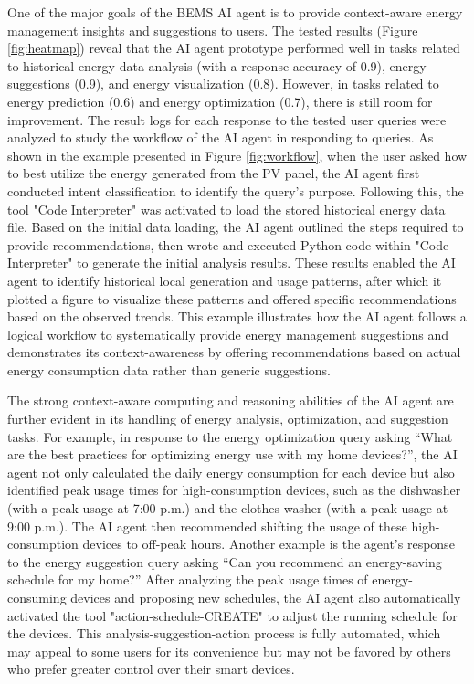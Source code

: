 \documentclass[final,3p,times]{elsarticle}
\begin{document}
One of the major goals of the BEMS AI agent is to provide context-aware energy management insights and suggestions to users. The tested results (Figure \ref{fig:heatmap}) reveal that the AI agent prototype performed well in tasks related to historical energy data analysis (with a response accuracy of 0.9), energy suggestions (0.9), and energy visualization (0.8). However, in tasks related to energy prediction (0.6) and energy optimization (0.7), there is still room for improvement. The result logs for each response to the tested user queries were analyzed to study the workflow of the AI agent in responding to queries. As shown in the example presented in Figure \ref{fig:workflow}, when the user asked how to best utilize the energy generated from the PV panel, the AI agent first conducted intent classification to identify the query's purpose. Following this, the tool "Code Interpreter" was activated to load the stored historical energy data file. Based on the initial data loading, the AI agent outlined the steps required to provide recommendations, then wrote and executed Python code within "Code Interpreter" to generate the initial analysis results. These results enabled the AI agent to identify historical local generation and usage patterns, after which it plotted a figure to visualize these patterns and offered specific recommendations based on the observed trends. This example illustrates how the AI agent follows a logical workflow to systematically provide energy management suggestions and demonstrates its context-awareness by offering recommendations based on actual energy consumption data rather than generic suggestions.

The strong context-aware computing and reasoning abilities of the AI agent are further evident in its handling of energy analysis, optimization, and suggestion tasks. For example, in response to the energy optimization query asking “What are the best practices for optimizing energy use with my home devices?”, the AI agent not only calculated the daily energy consumption for each device but also identified peak usage times for high-consumption devices, such as the dishwasher (with a peak usage at 7:00 p.m.) and the clothes washer (with a peak usage at 9:00 p.m.). The AI agent then recommended shifting the usage of these high-consumption devices to off-peak hours. Another example is the agent's response to the energy suggestion query asking “Can you recommend an energy-saving schedule for my home?” After analyzing the peak usage times of energy-consuming devices and proposing new schedules, the AI agent also automatically activated the tool "action-schedule-CREATE" to adjust the running schedule for the devices. This analysis-suggestion-action process is fully automated, which may appeal to some users for its convenience but may not be favored by others who prefer greater control over their smart devices.
\end{document}
